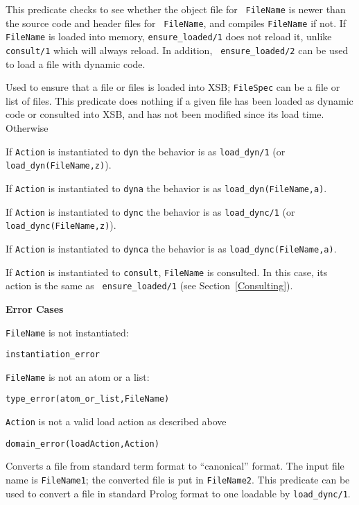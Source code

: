 \begin{description}
%
This predicate checks to see whether the object file for {\tt
FileName} is newer than the source code and header files for {\tt
FileName}, and compiles {\tt FileName} if not.  If {\tt FileName} is
loaded into memory, {\tt ensure\_loaded/1} does not reload it, unlike
{\tt consult/1} which will always reload.  In addition, {\tt
  ensure\_loaded/2} can be used to load a file with dynamic code.  
% 

%
Used to ensure that a file or files is loaded into XSB; {\tt FileSpec}
can be a file or list of files.  This predicate does nothing if a
given file has been loaded as dynamic code or consulted into XSB, and
has not been modified since its load time.  Otherwise
%
\bi
\item If {\tt Action} is instantiated to {\tt dyn} the behavior is as
{\tt load\_dyn/1} (or {\tt load\_dyn(FileName,z)}).

\item If {\tt Action} is instantiated to {\tt dyna} the behavior is as
{\tt load\_dyn(FileName,a)}.

\item If {\tt Action} is instantiated to {\tt dync} the behavior is as
{\tt load\_dync/1} (or {\tt load\_dync(FileName,z)}).

\item If {\tt Action} is instantiated to {\tt dynca} the behavior is as
{\tt load\_dync(FileName,a)}.

\item If {\tt Action} is instantiated to {\tt consult}, {\tt FileName}
  is consulted.  In this case, its action is the same as {\tt
    ensure\_loaded/1} (see Section~\ref{Consulting}).

\ei

{\bf Error Cases}
\bi
\item 	{\tt FileName} is not instantiated:
\bi
\item 	{\tt instantiation\_error}
\ei
\item 	{\tt FileName} is not an atom or a list:
\bi
\item 	{\tt type\_error(atom\_or\_list,FileName)}
\ei
%
\item 	{\tt Action} is not a valid load action as described above
\bi
\item 	{\tt domain\_error(loadAction,Action)}
\ei
%
\ei

%
    Converts a file from standard term format to ``canonical'' format.
    The input file name is {\tt FileName1}; the converted file is put in
    {\tt FileName2}.  This predicate can be used to convert a file in
    standard Prolog format to one loadable by {\tt load\_dync/1}. 
\end{description} 

